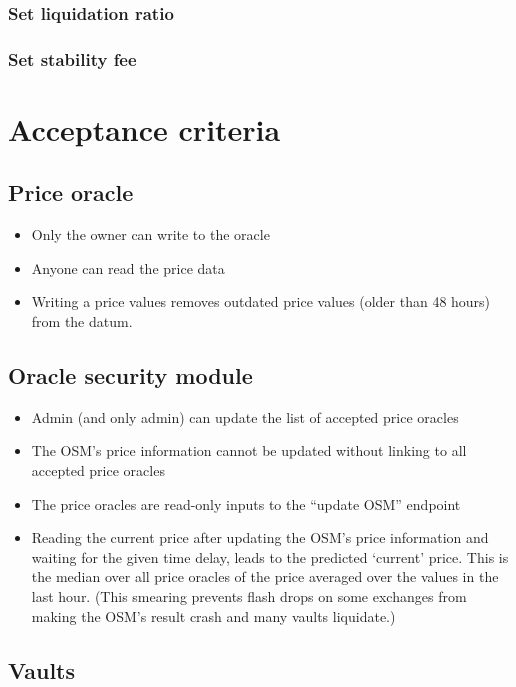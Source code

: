\documentclass{article} %
\begin{document}
\subsubsection{Set liquidation ratio}

\subsubsection{Set stability fee}

\section{Acceptance criteria}

\subsection{Price oracle}

\begin{itemize}
  \item Only the owner can write to the oracle
  \item Anyone can read the price data
  \item Writing a price values removes outdated price values (older than 48
    hours) from the datum.
\end{itemize}

\subsection{Oracle security module}

\begin{itemize}
  \item Admin (and only admin) can update the list of accepted price oracles
  \item The OSM's price information cannot be updated without linking to all
    accepted price oracles
  \item The price oracles are read-only inputs to the ``update OSM'' endpoint
  \item Reading the current price after updating the OSM's price information and
    waiting for the given time delay, leads to the predicted `current' price.
    This is the median over all price oracles of the price averaged over the
    values in the last hour. (This smearing prevents flash drops on some
    exchanges from making the OSM's result crash and many vaults liquidate.)
\end{itemize}

\subsection{Vaults}
\end{document}
